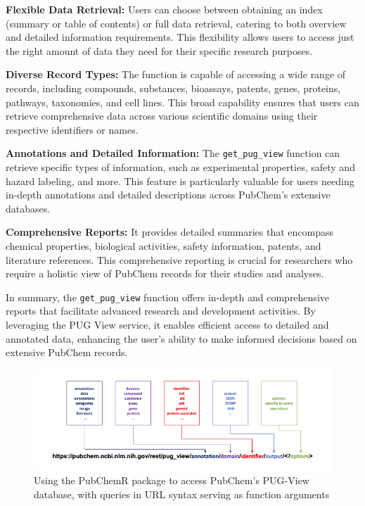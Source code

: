 \textbf{Flexible Data Retrieval:} Users can choose between obtaining an index (summary or table of contents) or full data retrieval, catering to both overview and detailed information requirements. This flexibility allows users to access just the right amount of data they need for their specific research purposes.

\textbf{Diverse Record Types:} The function is capable of accessing a wide range of records, including compounds, substances, bioassays, patents, genes, proteins, pathways, taxonomies, and cell lines. This broad capability ensures that users can retrieve comprehensive data across various scientific domains using their respective identifiers or names.

\textbf{Annotations and Detailed Information:} The \texttt{get\_pug\_view} function can retrieve specific types of information, such as experimental properties, safety and hazard labeling, and more. This feature is particularly valuable for users needing in-depth annotations and detailed descriptions across PubChem's extensive databases.

\textbf{Comprehensive Reports:} It provides detailed summaries that encompass chemical properties, biological activities, safety information, patents, and literature references. This comprehensive reporting is crucial for researchers who require a holistic view of PubChem records for their studies and analyses.

In summary, the \texttt{get\_pug\_view} function offers in-depth and comprehensive reports that facilitate advanced research and development activities. By leveraging the PUG View service, it enables efficient access to detailed and annotated data, enhancing the user's ability to make informed decisions based on extensive PubChem records.

\begin{figure}
\includegraphics[width=1\linewidth,height=0.2\textheight]{figures/Figure_2} \caption{Using the PubChemR package to access PubChem's PUG-View database, with queries in URL syntax serving as function arguments}\label{fig:figure2}
\end{figure}

